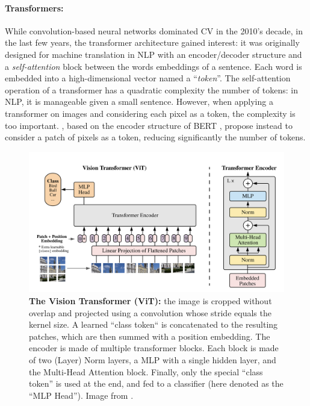 \paragraph{Transformers:} While convolution-based neural networks dominated \acf{CV} in the 2010's
decade, in the last few years, the transformer architecture gained interest: it was originally
designed for machine translation in \ac{NLP} \citep{vaswani2017transformer} with an encoder/decoder
structure and a \textit{self-attention} block between the words embeddings of a sentence. Each word is
embedded into a high-dimensional vector named a ``\textit{token}''. The self-attention operation of a
transformer has a quadratic complexity \wrt the number of tokens: in \ac{NLP}, it is manageable
given a small sentence. However, when applying a transformer on images and considering each pixel
as a token, the complexity is too important. \citet{dosovitskiy2020vit}, based on the encoder
structure of BERT \citep{devlin2018bert}, propose instead to consider a patch of pixels as a token,
reducing significantly the number of tokens.

\begin{figure}[tb]
      \begin{center}
            \includegraphics[width=\linewidth]{images/related/vit.png}
      \end{center}
      \caption{\textbf{The Vision Transformer (ViT):} the image is cropped without overlap and
            projected using a convolution whose stride equals the kernel size. A learned ``class
            token`` is concatenated to the resulting patches, which are then summed with a position
            embedding. The encoder is made of multiple transformer blocks. Each block is made of two
            (Layer) Norm layers, a MLP with a single hidden layer, and the Multi-Head Attention
            block. Finally, only the special ``class token'' is used at the end, and fed to a
            classifier (here denoted as the ``MLP Head''). Image from \citet{dosovitskiy2020vit}.}
      \label{fig:related_vit}
\end{figure}

